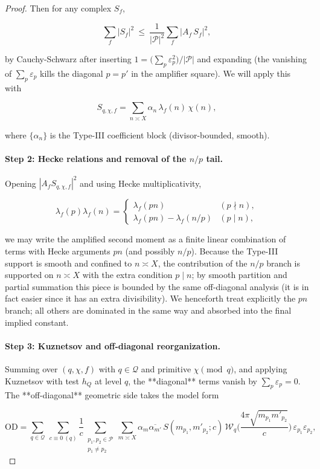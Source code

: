 \documentclass[11pt]{article}
\theoremstyle{definition}
\theoremstyle{remark}
\begin{document}
\begin{proof}
Then for any complex $S_f$,

$$
\sum_f |S_f|^2
\ \le\ \frac1{|\mathcal P|^2}\sum_f |A_f\,S_f|^2,
$$

by Cauchy-Schwarz after inserting $1=\big(\sum_p\varepsilon_p^2\big)/|\mathcal P|$ and expanding (the vanishing of $\sum_p\varepsilon_p$ kills the diagonal $p=p'$ in the amplifier square). We will apply this with

$$
S_{q,\chi,f}=\sum_{n\asymp X}\alpha_n\,\lambda_f(n)\,\chi(n),
$$

where $\{\alpha_n\}$ is the Type-III coefficient block (divisor-bounded, smooth).

\paragraph{Step 2: Hecke relations and removal of the $n/p$ tail.}

Opening $|A_f S_{q,\chi,f}|^2$ and using Hecke multiplicativity,

$$
\lambda_f(p)\lambda_f(n)=
\begin{cases}
\lambda_f(pn) & (p\nmid n),\\
\lambda_f(pn)-\lambda_f(n/p) & (p\mid n),
\end{cases}
$$

we may write the amplified second moment as a finite linear combination of terms with Hecke arguments $pn$ (and possibly $n/p$). Because the Type-III support is smooth and confined to $n\asymp X$, the contribution of the $n/p$ branch is supported on $n\asymp X$ with the extra condition $p\mid n$; by smooth partition and partial summation this piece is bounded by the same off-diagonal analysis (it is in fact easier since it has an extra divisibility). We henceforth treat explicitly the $pn$ branch; all others are dominated in the same way and absorbed into the final implied constant.

\paragraph{Step 3: Kuznetsov and off-diagonal reorganization.}

Summing over $(q,\chi,f)$ with $q\in\mathcal Q$ and primitive $\chi\pmod q$, and applying Kuznetsov with test $h_Q$ at level $q$, the **diagonal** terms vanish by $\sum_p\varepsilon_p=0$. The **off-diagonal** geometric side takes the model form

$$
\mathrm{OD}
=\sum_{q\in\mathcal Q}\ \sum_{c\equiv 0\ (q)} \frac{1}{c}\!
\sum_{\substack{p_1,p_2\in\mathcal P\\ p_1\ne p_2}}\!
\sum_{m\asymp X} \alpha_m\overline{\alpha_{m'}}\,
S(m_{p_1},m'_{p_2};c)\,
\mathcal W_q\!\Big(\frac{4\pi\sqrt{m_{p_1}m'_{p_2}}}{c}\Big)\,
\varepsilon_{p_1}\varepsilon_{p_2},
$$


\end{proof}
\end{document}
